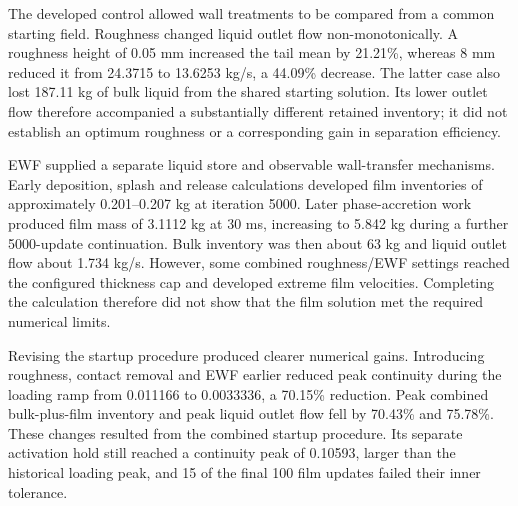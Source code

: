 The developed control allowed wall treatments to be compared from a common starting field. Roughness changed liquid outlet flow non-monotonically. A roughness height of 0.05 mm increased the tail mean by 21.21\%, whereas 8 mm reduced it from 24.3715 to 13.6253 kg/s, a 44.09\% decrease. The latter case also lost 187.11 kg of bulk liquid from the shared starting solution. Its lower outlet flow therefore accompanied a substantially different retained inventory; it did not establish an optimum roughness or a corresponding gain in separation efficiency.

EWF supplied a separate liquid store and observable wall-transfer mechanisms. Early deposition, splash and release calculations developed film inventories of approximately 0.201--0.207 kg at iteration 5000. Later phase-accretion work produced film mass of 3.1112 kg at 30 ms, increasing to 5.842 kg during a further 5000-update continuation. Bulk inventory was then about 63 kg and liquid outlet flow about 1.734 kg/s. However, some combined roughness/EWF settings reached the configured thickness cap and developed extreme film velocities. Completing the calculation therefore did not show that the film solution met the required numerical limits.

Revising the startup procedure produced clearer numerical gains. Introducing roughness, contact removal and EWF earlier reduced peak continuity during the loading ramp from 0.011166 to 0.0033336, a 70.15\% reduction. Peak combined bulk-plus-film inventory and peak liquid outlet flow fell by 70.43\% and 75.78\%. These changes resulted from the combined startup procedure. Its separate activation hold still reached a continuity peak of 0.10593, larger than the historical loading peak, and 15 of the final 100 film updates failed their inner tolerance.


